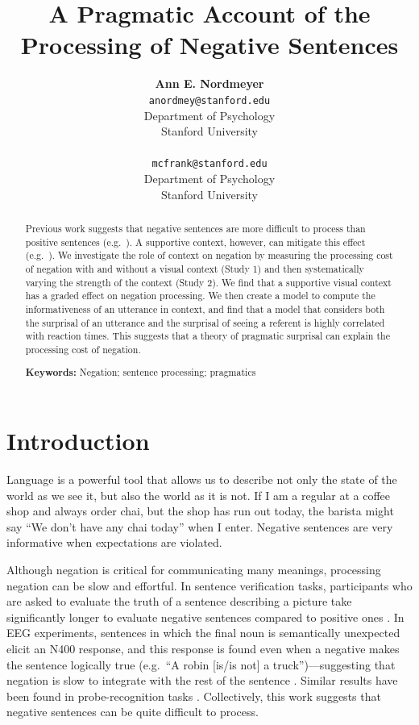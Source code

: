 \documentclass[10pt,letterpaper]{article}
\title{A Pragmatic Account of the Processing of Negative Sentences}
\author{{\large \bf Ann E. Nordmeyer} \\ \texttt{anordmey@stanford.edu}\\ Department of Psychology \\ Stanford University \\ 
\And {\large \bf Michael C. Frank} \\ \texttt{mcfrank@stanford.edu} \\ Department of Psychology \\ Stanford University \\ }
\begin{document}
\maketitle

\begin{abstract}

Previous work suggests that negative sentences are more difficult to process than positive sentences (e.g.\ ). A supportive context, however, can mitigate this effect (e.g.\ ).  We investigate the role of context on negation by measuring the processing cost of negation with and without a visual context (Study 1) and then systematically varying the strength of the context (Study 2).  We find that a supportive visual context has a graded effect on negation processing.  We then create a model to compute the informativeness of an utterance in context, and find that a model that considers both the surprisal of an utterance and the surprisal of seeing a referent is highly correlated with reaction times.  This suggests that a theory of pragmatic surprisal can explain the processing cost of negation.  

\textbf{Keywords:} 
Negation; sentence processing; pragmatics
\end{abstract}

\section{Introduction}

Language is a powerful tool that allows us to describe not only the state of the world as we see it, but also the world as it is not.  If I am a regular at a coffee shop and always order chai, but the shop has run out today, the barista might say ``We don't have any chai today'' when I enter.  Negative sentences are very informative when expectations are violated.

Although negation is critical for communicating many meanings, processing negation can be slow and effortful.  In sentence verification tasks, participants who are asked to evaluate the truth of a sentence describing a picture take significantly longer to evaluate negative sentences compared to positive ones \cite{hclark1972, carpenter1975, just1971, just1976}. In EEG experiments, sentences in which the final noun is semantically unexpected elicit an N400 response, and this response is found even when a negative makes the sentence logically true (e.g.\ ``A robin [is/is not] a truck'')---suggesting that negation is slow to integrate with the rest of the sentence \cite{fischler1983, ludtke2008}.  Similar results have been found in probe-recognition tasks \cite{kaup2003, kaup2006, hasson2006}.  Collectively, this work suggests that negative sentences can be quite difficult to process.
 
\end{document}
